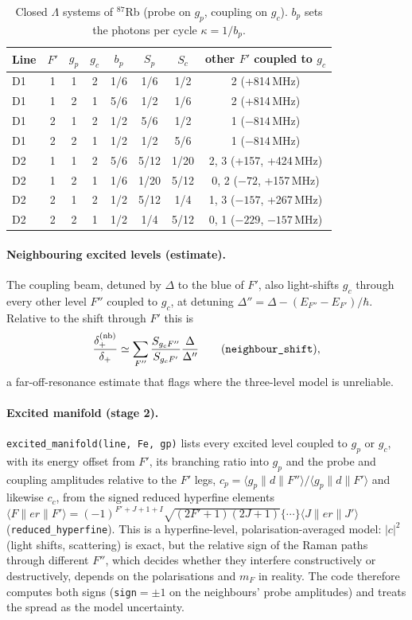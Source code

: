 \documentclass[11pt,a4paper]{article}
\newcommand{\code}[1]{\texttt{#1}}
\begin{document}
\begin{table}[h]
\centering\small
\caption{Closed $\Lambda$ systems of $^{87}$Rb (probe on $g_p$, coupling on $g_c$). $b_p$ sets the photons per cycle $\kappa=1/b_p$.}
\label{tab:configs}
\begin{tabular}{@{}lccccccc@{}}
\toprule
Line & $F'$ & $g_p$ & $g_c$ & $b_p$ & $S_p$ & $S_c$ & other $F'$ coupled to $g_c$\\
\midrule
D1 & 1 & 1 & 2 & 1/6 & 1/6 & 1/2 & 2 (+814\,MHz)\\
D1 & 1 & 2 & 1 & 5/6 & 1/2 & 1/6 & 2 (+814\,MHz)\\
D1 & 2 & 1 & 2 & 1/2 & 5/6 & 1/2 & 1 ($-814$\,MHz)\\
D1 & 2 & 2 & 1 & 1/2 & 1/2 & 5/6 & 1 ($-814$\,MHz)\\
D2 & 1 & 1 & 2 & 5/6 & 5/12 & 1/20 & 2, 3 (+157, +424\,MHz)\\
D2 & 1 & 2 & 1 & 1/6 & 1/20 & 5/12 & 0, 2 ($-72$, +157\,MHz)\\
D2 & 2 & 1 & 2 & 1/2 & 5/12 & 1/4 & 1, 3 ($-157$, +267\,MHz)\\
D2 & 2 & 2 & 1 & 1/2 & 1/4 & 5/12 & 0, 1 ($-229$, $-157$\,MHz)\\
\bottomrule
\end{tabular}
\end{table}

\paragraph{Neighbouring excited levels (estimate).} The coupling beam, detuned by $\Delta$ to the blue of $F'$, also light-shifts $g_c$ through every other level $F''$ coupled to $g_c$, at detuning $\Delta''=\Delta-(E_{F''}-E_{F'})/\hbar$. Relative to the shift through $F'$ this is
\begin{equation}
  \frac{\delta_+^{(\rm nb)}}{\delta_+}\simeq\sum_{F''}\frac{S_{g_cF''}}{S_{g_cF'}}\frac{\Delta}{\Delta''}\qquad(\code{neighbour\_shift}),
\end{equation}
a far-off-resonance estimate that flags where the three-level model is unreliable.

\paragraph{Excited manifold (stage 2).} \code{excited\_manifold(line, Fe, gp)} lists every excited level coupled to $g_p$ or $g_c$, with its energy offset from $F'$, its branching ratio into $g_p$ and the probe and coupling amplitudes relative to the $F'$ legs, $c_p=\langle g_p\|d\|F''\rangle/\langle g_p\|d\|F'\rangle$ and likewise $c_c$, from the signed reduced hyperfine elements $\langle F\|er\|F'\rangle=(-1)^{F'+J+1+I}\sqrt{(2F'+1)(2J+1)}\{\cdots\}\langle J\|er\|J'\rangle$ (\code{reduced\_hyperfine}). This is a hyperfine-level, polarisation-averaged model: $|c|^2$ (light shifts, scattering) is exact, but the relative sign of the Raman paths through different $F''$, which decides whether they interfere constructively or destructively, depends on the polarisations and $m_F$ in reality. The code therefore computes both signs (\code{sign}$=\pm1$ on the neighbours' probe amplitudes) and treats the spread as the model uncertainty.
\end{document}
